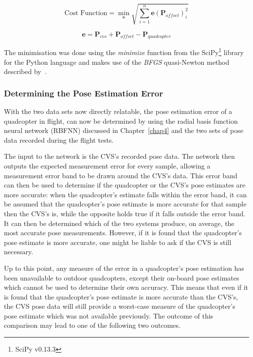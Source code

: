 \begin{equation}
  \label{eq:chap5-err-func}
  \text{Cost Function} = \min_{\bm{e}}\sqrt{\displaystyle\sum_{i=1}^{n} \bm{e}(\bm{P}_{of\!fset})_i^2}
\end{equation}

\begin{equation}
  \label{eq:chap5-err-term}
  \bm{e} = \bm{P}_{cvs} + \bm{P}_{of\!fset} - \bm{P}_{quadcopter}
\end{equation}

The minimisation was done using the \emph{minimize} function from the SciPy\footnote{SciPy v0.13.3} library for the Python language and makes use of the \emph{BFGS} quasi-Newton method described by~\cite{nocedal2006numerical}. 

\subsubsection{Determining the Pose Estimation Error}

With the two data sets now directly relatable, the pose estimation error of a quadcopter in flight, can now be determined by using the radial basis function neural network (RBFNN) discussed in Chapter~\ref{chap4} and the two sets of pose data recorded during the flight tests.  

The input to the network is the CVS's recorded pose data. The network then outputs the expected measurement error for every sample, allowing a measurement error band to be drawn around the CVS's data. This error band can then be used to determine if the quadcopter or the CVS's pose estimates are more accurate: when the quadcopter's estimate falls within the error band, it can be assumed that the quadcopter's pose estimate is more accurate for that sample then the CVS's is, while the opposite holds true if it falls outside the error band. It can then be determined which of the two systems produce, on average, the most accurate pose measurements. However, if it is found that the quadcopter's pose estimate is more accurate, one might be liable to ask if the CVS is still necessary.

Up to this point, any measure of the error in a quadcopter's pose estimation has been unavailable to outdoor quadcopters, except their on-board pose estimates which cannot be used to determine their own accuracy. This means that even if it is found that the quadcopter's pose estimate is more accurate than the CVS's, the CVS pose data will still provide a worst-case measure of the quadcopter's pose estimate which was not available previously. The outcome of this comparison may lead to one of the following two outcomes.

